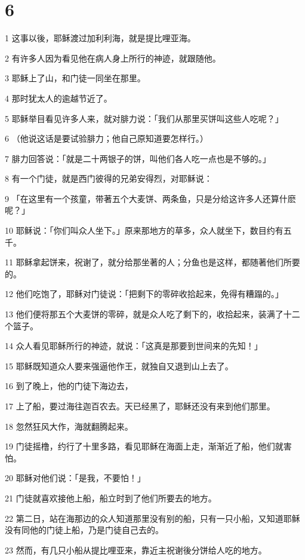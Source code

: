 \chapter{6}

\par 1 这事以後，耶稣渡过加利利海，就是提比哩亚海。
\par 2 有许多人因为看见他在病人身上所行的神迹，就跟随他。
\par 3 耶稣上了山，和门徒一同坐在那里。
\par 4 那时犹太人的逾越节近了。
\par 5 耶稣举目看见许多人来，就对腓力说：「我们从那里买饼叫这些人吃呢？」
\par 6 （他说这话是要试验腓力；他自己原知道要怎样行。）
\par 7 腓力回答说：「就是二十两银子的饼，叫他们各人吃一点也是不够的。」
\par 8 有一个门徒，就是西门彼得的兄弟安得烈，对耶稣说：
\par 9 「在这里有一个孩童，带著五个大麦饼、两条鱼，只是分给这许多人还算什麽呢？」
\par 10 耶稣说：「你们叫众人坐下。」原来那地方的草多，众人就坐下，数目约有五千。
\par 11 耶稣拿起饼来，祝谢了，就分给那坐著的人；分鱼也是这样，都随著他们所要的。
\par 12 他们吃饱了，耶稣对门徒说：「把剩下的零碎收拾起来，免得有糟蹋的。」
\par 13 他们便将那五个大麦饼的零碎，就是众人吃了剩下的，收拾起来，装满了十二个篮子。
\par 14 众人看见耶稣所行的神迹，就说：「这真是那要到世间来的先知！」
\par 15 耶稣既知道众人要来强逼他作王，就独自又退到山上去了。
\par 16 到了晚上，他的门徒下海边去，
\par 17 上了船，要过海往迦百农去。天已经黑了，耶稣还没有来到他们那里。
\par 18 忽然狂风大作，海就翻腾起来。
\par 19 门徒摇橹，约行了十里多路，看见耶稣在海面上走，渐渐近了船，他们就害怕。
\par 20 耶稣对他们说：「是我，不要怕！」
\par 21 门徒就喜欢接他上船，船立时到了他们所要去的地方。
\par 22 第二日，站在海那边的众人知道那里没有别的船，只有一只小船，又知道耶稣没有同他的门徒上船，乃是门徒自己去的。
\par 23 然而，有几只小船从提比哩亚来，靠近主祝谢後分饼给人吃的地方。

